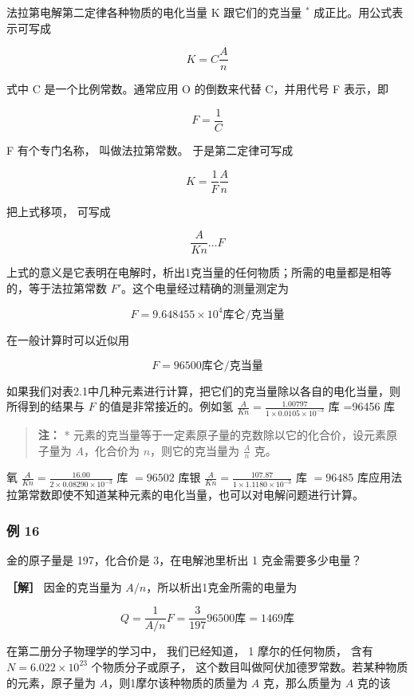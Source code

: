 法拉第电解第二定律各种物质的电化当量 K 跟它们的克当量 \(^{*}\)
成正比。用公式表示可写成

\[
K = C \frac{A}{n}
\]

式中 C 是一个比例常数。通常应用 O 的倒数来代替 C，并用代号 F 表示，即

\[
F = \frac{1}{C}
\]

F 有个专门名称， 叫做法拉第常数。 于是第二定律可写成

\[
K = \frac{1}{F} \frac{A}{n} \tag{2.10}
\]

把上式移项， 可写成

\[
\frac{A}{K n} \dots F
\]

上式的意义是它表明在电解时，析出1克当量的任何物质；所需的电量都是相等的，等于法拉第常数
\(F'\)。这个电量经过精确的测量测定为

\[
F = 9.648455 \times 10^{4} \text{库仑/克当量}
\]

在一般计算时可以近似用

\[
F = 96500 \text{库仑/克当量}
\]

如果我们对表2.1中几种元素进行计算，把它们的克当量除以各自的电化当量，则所得到的结果与
\(F\) 的值是非常接近的。例如氢
\(\frac{A}{Kn}=\frac{1.00797}{1\times0.0105\times10^{-3}}\) 库 =96456 库

\begin{quote}
\textbf{注：} *
元素的克当量等于一定素原子量的克数除以它的化合价，设元素原子量为
\(A\)，化合价为 \(n\)，则它的克当量为 \(\frac{A}{n}\) 克。
\end{quote}

氧 \(\frac{A}{Kn} = \frac{16.00}{2\times 0.08290\times 10^{-3}}\) 库
\(= 96502\) 库银
\(\frac{A}{Kn} = \frac{107.87}{1\times 1.1180\times 10^{-3}}\) 库
\(= 96485\)
库应用法拉第常数即使不知道某种元素的电化当量，也可以对电解问题进行计算。

\subsubsection{例 16}\label{ux4f8b-16-1}

金的原子量是 197，化合价是 3，在电解池里析出 1 克金需要多少电量？

\textbf{［解］} 因金的克当量为 \(A / n\)，所以析出1克金所需的电量为

\[
Q = \frac{1}{A / n} F = \frac{3}{197} 96500 \text{库} = 1469 \text{库}
\]

在第二册分子物理学的学习中， 我们已经知道， 1 摩尔的任何物质， 含有
\(N = 6.022 \times 10^{23}\) 个物质分子或原子，
这个数目叫做阿伏加德罗常数。若某种物质的元素，原子量为
\(A\)，则1摩尔该种物质的质量为 \(A\) 克，那么质量为 \(A\) 克的该

